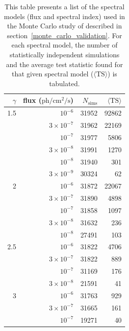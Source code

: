 \documentclass[12pt,preprint]{aastex}
\newcommand{\ph}{\text{ph}\xspace}
\newcommand{\cm}{\text{cm}\xspace}
\renewcommand{\sec}{\text{s}\xspace}
\newcommand{\ts}{\text{TS}\xspace}
\newcommand{\pointlike}{\text{\em pointlike}\xspace}
\begin{document}
\begin{table}
  \begin{centering}
    \begin{tabular}{ r | r | r | r }
      \hline
      \hline
      $\gamma$ & flux ($\ph/\cm^2/\sec$) & $N_\text{sims}$ & $\langle\ts\rangle$ \\
      \hline
      1.5 &          $10^{-6}$ &           31952 &  92862 \\
      &  $3\times 10^{-7}$ &           31962 &  22169 \\
      &          $10^{-7}$ &           31977 &   5806 \\
      &  $3\times 10^{-8}$ &           31991 &   1270 \\
      &          $10^{-8}$ &           31940 &    301 \\
      &  $3\times 10^{-9}$ &           30324 &     62 \\
      \hline
      2 &          $10^{-6}$ &           31872 &  22067 \\
      &  $3\times 10^{-7}$ &           31890 &   4898 \\
      &          $10^{-7}$ &           31858 &   1097 \\
      &  $3\times 10^{-8}$ &           31632 &    236 \\
      &          $10^{-8}$ &           27491 &    103 \\
      \hline
      2.5 &          $10^{-6}$ &           31822 &   4706 \\
      &  $3\times 10^{-7}$ &           31822 &    889 \\
      &          $10^{-7}$ &           31169 &    176 \\
      &  $3\times 10^{-8}$ &           21591 &     41 \\
      \hline                                                
      3 &          $10^{-6}$ &           31763 &    929 \\
      &  $3\times 10^{-7}$ &           31665 &    161 \\
      &          $10^{-7}$ &           19271 &     40 \\
      \hline
    \end{tabular}
    \caption{
    This table presents a list of the spectral models (flux and spectral
    index) used in the Monte Carlo study of \pointlike described in
    section~\ref{monte_carlo_validation}.  For each spectral model, the
    number of statistically independent simulations and the average test
    statistic found for that given spectral model ($\langle\ts\rangle$) is tabulated.
}
\end{centering}
\end{table}
\end{document}
